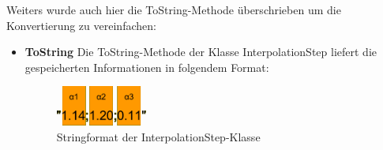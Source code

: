 Weiters wurde auch hier die ToString-Methode überschrieben um die Konvertierung zu vereinfachen:
\begin{itemize}
\item \textbf{ToString}
Die ToString-Methode der Klasse InterpolationStep liefert die gespeicherten Informationen in folgendem Format:\\
\begin{figure}[H]
  \centering
  \begin{minipage}[t]{16.5 cm}
  	\centering
  	\includegraphics[width=3cm]{images/InterpolationStep} 
    \caption{Stringformat der InterpolationStep-Klasse}
  \end{minipage}
\end{figure}
\end{itemize}

